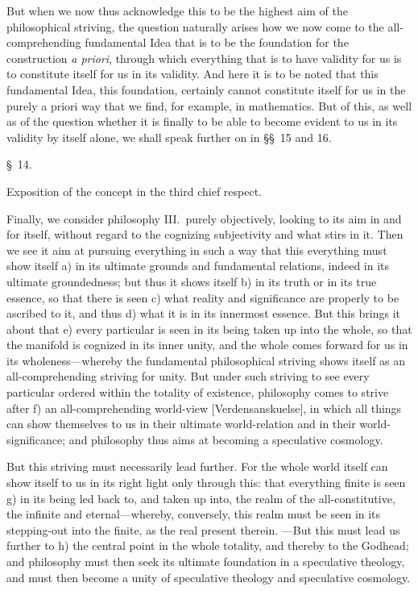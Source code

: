 \documentclass[12pt,a4paper]{book}
\begin{document}
{\small But when we now thus acknowledge this to be the highest aim of the
philosophical striving, the question naturally arises how we now come to the
all-comprehending fundamental Idea that is to be the foundation for the construction
\textit{a priori}, through which everything that is to have validity for us is to
constitute itself for us in its validity. And here it is to be noted that this
fundamental Idea, this foundation, certainly cannot constitute itself for us in the
purely a priori way that we find, for example, in mathematics. But of this, as well
as of the question whether it is finally to be able to become evident to us in its
validity by itself alone, we shall speak further on in \S\S~15 and 16.\par}

\begin{center}\large\S~14.\end{center}
\begin{center}Exposition of the concept in the third chief respect.\end{center}

Finally, we consider philosophy III.~purely objectively, looking to its aim in and
for itself, without regard to the cognizing subjectivity and what stirs in it. Then
we see it aim at pursuing everything in such a way that this everything must show
itself a) in its ultimate grounds and fundamental relations, indeed in its ultimate
groundedness; but thus it shows itself b) in its truth or in its true essence, so
that there is seen c) what reality and significance are properly to be ascribed to
it, and thus d) what it is in its innermost essence. But this brings it about that
e) every particular is seen in its being taken up into the whole, so that the
manifold is cognized in its inner unity, and the whole comes forward for us in its
wholeness---whereby the fundamental philosophical striving shows itself as an
all-comprehending striving for unity. But under such striving to see every
particular ordered within the totality of existence, philosophy comes to strive
after f) an all-comprehending world-view [Verdensanskuelse], in which all things
can show themselves to us in their ultimate world-relation and in their
world-significance; and philosophy thus aims at becoming a speculative cosmology.

But this striving must necessarily lead further. For the whole world itself can
show itself to us in its right light only through this: that everything finite is
seen g) in its being led back to, and taken up into, the realm of the
all-constitutive, the infinite and eternal---whereby, conversely, this realm must
be seen in its stepping-out into the finite, as the real present therein. ---But
this must lead us further to h) the central point in the whole totality, and thereby
to the Godhead; and philosophy must then seek its ultimate foundation in a
speculative theology, and must then become a unity of speculative theology and
speculative cosmology.
\end{document}
